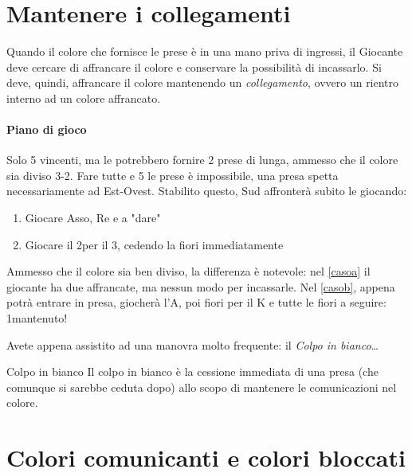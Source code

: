 \documentclass[../corsofiori.tex]{subfiles}
\begin{document}
\section{Mantenere i collegamenti}

Quando il colore che fornisce le prese è in una mano priva di ingressi, il Giocante deve cercare di affrancare il colore
e conservare la possibilità di incassarlo. Si deve, quindi, affrancare il colore mantenendo un \emph{collegamento}, ovvero un
rientro interno ad un colore affrancato.

\newgame
{}
\leftupper{\boardtext*}%
{\dealertext\quad}{\vulnertext}
\rightlower[2ex]{\lead: 4\Sp}{}{}

\showAll*

\paragraph{Piano di gioco} Solo 5 vincenti, ma le \fio potrebbero fornire 2 prese di lunga, ammesso che il colore sia
diviso 3-2. Fare tutte e 5 le prese è impossibile, una presa spetta necessariamente ad Est-Ovest. Stabilito questo, Sud
affronterà subito le \fio giocando:
\renewcommand{\itemautorefname}{Caso}
\begin{enumerate}[label=\alph*)]
    \item\label{casoa} Giocare Asso, Re e \fio a "dare"
    \item\label{casob} Giocare il 2\Cl per il 3\Cl, cedendo la fiori immediatamente
\end{enumerate}
Ammesso che il colore sia ben diviso, la differenza è notevole: nel \autoref{casoa} il giocante ha due \fio affrancate,
ma nessun modo per incassarle. Nel \autoref{casob}, appena potrà entrare in presa, giocherà l'A\Cl, poi fiori per il
K e tutte le fiori a seguire: 1\SA mantenuto!

Avete appena assistito ad una manovra molto frequente: il \emph{Colpo in bianco}\ldots

\begin{regola}{Colpo in bianco}
    Il colpo in bianco è la cessione immediata di una presa (che comunque si sarebbe ceduta dopo) allo scopo di
    mantenere le comunicazioni nel colore.
\end{regola}


\section{Colori comunicanti e colori bloccati}
\end{document}
